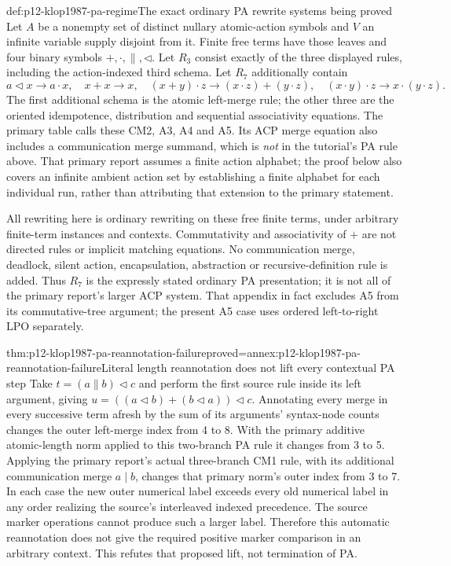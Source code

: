 \begin{hbdefinition}{def:p12-klop1987-pa-regime}{The exact ordinary PA rewrite systems being proved}
Let \(A\) be a nonempty set of distinct nullary atomic-action symbols
and \(V\) an infinite variable supply disjoint from it. Finite free
terms have those leaves and four binary symbols
\(+,\cdot,\parallel,\lhd\). Let \(R_3\) consist exactly of
the three displayed rules, including the action-indexed third schema.
Let \(R_7\) additionally contain
\[
 a\mathbin{\lhd}x\to a\cdot x,\quad x+x\to x,\quad
 (x+y)\cdot z\to(x\cdot z)+(y\cdot z),\quad
 (x\cdot y)\cdot z\to x\cdot(y\cdot z).
\]
The first additional schema is the atomic left-merge rule; the other
three are the oriented idempotence, distribution and sequential
associativity equations. The primary table calls these CM2, A3,
A4 and A5. Its ACP merge equation also includes a communication
merge summand, which is \emph{not} in the tutorial's PA rule above.
That primary report assumes a finite action alphabet; the proof below
also covers an infinite ambient action set by establishing a finite
alphabet for each individual run, rather than attributing that
extension to the primary statement.

All rewriting here is ordinary rewriting on these free finite terms,
under arbitrary finite-term instances and contexts. Commutativity
and associativity of \(+\) are not directed rules or implicit
matching equations. No communication merge, deadlock, silent action,
encapsulation, abstraction or recursive-definition rule is added.
Thus \(R_7\) is the expressly stated ordinary PA presentation;
it is not all of the primary report's larger ACP system. That
appendix in fact excludes A5 from its commutative-tree argument;
the present A5 case uses ordered left-to-right LPO separately.
\end{hbdefinition}

\begin{hblemma}{thm:p12-klop1987-pa-reannotation-failure}{proved=annex:p12-klop1987-pa-reannotation-failure}{Literal length reannotation does not lift every contextual PA step}
Take \(t=(a\parallel b)\mathbin{\lhd}c\) and perform the first
source rule inside its left argument, giving
\(u=((a\mathbin{\lhd}b)+(b\mathbin{\lhd}a))\mathbin{\lhd}c\).
Annotating every merge in every successive term afresh by the sum
of its arguments' syntax-node counts changes the outer left-merge
index from 4 to 8. With the primary additive atomic-length norm applied
to this two-branch PA rule it changes from 3 to 5. Applying the primary
report's actual three-branch CM1 rule, with its additional communication
merge \(a\mathbin{|}b\), changes that primary norm's outer index
from 3 to 7. In each case the new outer numerical label
exceeds every old numerical label in any order realizing the source's
interleaved indexed precedence. The source marker operations cannot
produce such a larger label. Therefore this automatic reannotation
does not give the required positive marker comparison in an arbitrary
context. This refutes that proposed lift, not termination of PA.
\end{hblemma}

